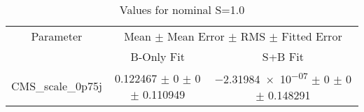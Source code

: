 \begin{table}
\centering
\caption{Values for nominal S=1.0}
\begin{tabular}{ccc}
\toprule
Parameter 	& \multicolumn{2}{c}{Mean $\pm$ Mean Error $\pm$ RMS $\pm$ Fitted Error}\\
 	& B-Only Fit & S+B Fit\\
\midrule
CMS\_scale\_0p75j 	& \num{0.122467} $\pm$ \num{0} $\pm$ \num{0} $\pm$ \num{0.110949} 	& \num{-2.31984e-07} $\pm$ \num{0} $\pm$ \num{0} $\pm$ \num{0.148291}\\
\bottomrule
\end{tabular}
\end{table}